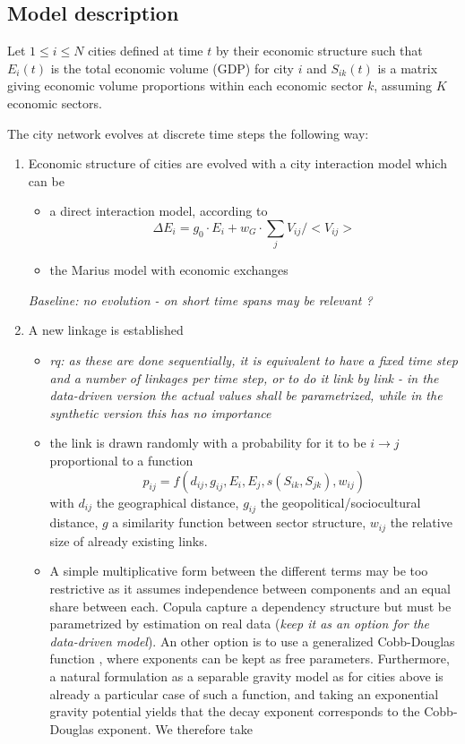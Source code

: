 \documentclass{article}
\begin{document}
\subsection{Model description}

Let $1 \leq i \leq N$ cities defined at time $t$ by their economic structure such that $E_i(t)$ is the total economic volume (GDP) for city $i$ and $S_{ik}(t)$ is a matrix giving economic volume proportions within each economic sector $k$, assuming $K$ economic sectors.


The city network evolves at discrete time steps the following way:
\begin{enumerate}
    \item Economic structure of cities are evolved with a city interaction model which can be
    \begin{itemize}
        \item a direct interaction model, according to
        \begin{equation}
            \Delta E_i = g_0\cdot E_i + w_G \cdot \sum_j V_{ij}/<V_{ij}>
        \end{equation}
        \item the Marius model with economic exchanges
    \end{itemize}
    \textit{Baseline: no evolution - on short time spans may be relevant ?}
    \item A new linkage is established
    \begin{itemize}
        \item \textit{rq: as these are done sequentially, it is equivalent to have a fixed time step and a number of linkages per time step, or to do it link by link - in the data-driven version the actual values shall be parametrized, while in the synthetic version this has no importance}
        \item the link is drawn randomly with a probability for it to be $i \rightarrow j$ proportional to a function
    \begin{equation}
        p_{ij} = f(d_{ij},g_{ij},E_i,E_j,s(S_{ik},S_{jk}),w_{ij})
    \end{equation}
    with $d_{ij}$ the geographical distance, $g_{ij}$ the geopolitical/sociocultural distance, $g$ a similarity function between sector structure, $w_{ij}$ the relative size of already existing links.
    \item A simple multiplicative form between the different terms may be too restrictive as it assumes independence between components and an equal share between each. Copula capture a dependency structure but must be parametrized by estimation on real data (\textit{keep it as an option for the data-driven model}). An other option is to use a generalized Cobb-Douglas function \citep{vilcu2011geometric}, where exponents can be kept as free parameters. Furthermore, a natural formulation as a separable gravity model as for cities above is already a particular case of such a function, and taking an exponential gravity potential yields that the decay exponent corresponds to the Cobb-Douglas exponent. We therefore take

\end{itemize}
\end{enumerate}
\end{document}
